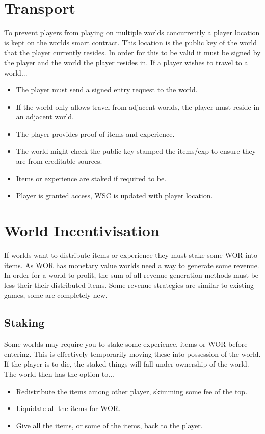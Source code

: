 \documentclass[runningheads,a4paper]{llncs}
\begin{document}
\section{Transport}
To prevent players from playing on multiple worlds concurrently a player location is kept on the worlds smart contract. This location is the public key of the world that the player currently resides. In order for this to be valid it must be signed by the player and the world the player resides in. If a player wishes to travel to a world... 

\begin{itemize}
\item{The player must send a signed entry request to the world.}
\item{If the world only allows travel from adjacent worlds, the player must reside in an adjacent world.}
\item{The player provides proof of items and experience.}
\item{The world might check the public key stamped the items/exp to ensure they are from creditable sources.}
\item{Items or experience are staked if required to be.}
\item{Player is granted access, WSC is updated with player location.}
\end{itemize}

\section{World Incentivisation}
\label{MakeMoney}
If worlds want to distribute items or experience they must stake some WOR into items. As WOR has monetary value worlds need a way to generate some revenue. In order for a world to profit, the sum of all revenue generation methods must be less their their distributed items. Some revenue strategies are similar to existing games, some are completely new. 

\subsection{Staking}
\label{Staking}
Some worlds may require you to stake some experience, items or WOR before entering. This is effectively temporarily moving these into possession of the world. If the player is to die, the staked things will fall under ownership of the world. The world then has the option to...

\begin{itemize}
\item{Redistribute the items among other player, skimming some fee of the top.}
\item{Liquidate all the items for WOR.}
\item{Give all the items, or some of the items, back to the player.}
\end{itemize}
\end{document}
